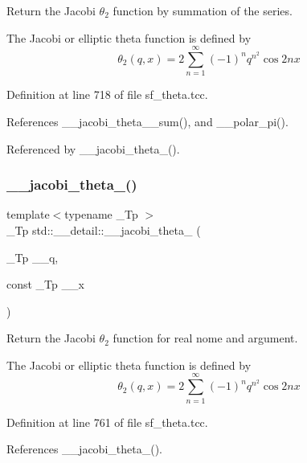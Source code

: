 Return the Jacobi $ \theta_2 $ function by summation of the series.

The Jacobi or elliptic theta function is defined by \[ \theta_2(q,x) = 2\sum_{n=1}^{\infty}(-1)^n q^{n^2}\cos{2nx} \] 

Definition at line 718 of file sf\+\_\+theta.\+tcc.



References \+\_\+\+\_\+jacobi\+\_\+theta\+\_\+\_\+sum(), and \+\_\+\+\_\+polar\+\_\+pi().



Referenced by \+\_\+\+\_\+jacobi\+\_\+theta\+\_().

\mbox{\label{namespacestd_1_1____detail_a5aace3bea7c88443d5bceb503a0452d0}} 
\subsubsection{\texorpdfstring{\+\_\+\+\_\+jacobi\+\_\+theta\+\_()}{\_\_jacobi\_theta\_2()}\hspace{0.1cm}{\footnotesize\ttfamily [2/2]}}
{\footnotesize\ttfamily template$<$typename \+\_\+\+Tp $>$ \\
\+\_\+\+Tp std\+::\+\_\+\+\_\+detail\+::\+\_\+\+\_\+jacobi\+\_\+theta\+\_ (\begin{DoxyParamCaption}\item[{\+\_\+\+Tp}]{\+\_\+\+\_\+q,  }\item[{const \+\_\+\+Tp}]{\+\_\+\+\_\+x }\end{DoxyParamCaption})}

Return the Jacobi $ \theta_2 $ function for real nome and argument.

The Jacobi or elliptic theta function is defined by \[ \theta_2(q,x) = 2\sum_{n=1}^{\infty}(-1)^n q^{n^2}\cos{2nx} \] 

Definition at line 761 of file sf\+\_\+theta.\+tcc.



References \+\_\+\+\_\+jacobi\+\_\+theta\+\_().

\mbox{\label{namespacestd_1_1____detail_a83ede07a0108c30b3fd6f8e59b7bd7d2}} 
